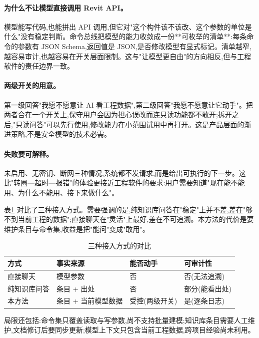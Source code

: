 \documentclass[UTF8,a4paper,zihao=-4]{ctexart}
\begin{document}
\paragraph{为什么不让模型直接调用 Revit API。}
模型能写代码,也能拼出 API 调用,但它对"这个构件该不该改、这个参数的单位是什么"没有稳定判断。命令总线把模型的能力收敛成一份**可枚举的清单**:每条命令的参数有 JSON Schema,返回值是 JSON,是否修改模型有显式标记。清单越窄,越容易审计,也越容易在开关层面限制。这与"让模型更自由"的方向相反,但与工程软件的责任边界一致。

\paragraph{两级开关的用意。}
第一级回答"我愿不愿意让 AI 看工程数据",第二级回答"我愿不愿意让它动手"。把两者合在一个开关上,保守用户会因为担心误改而连只读功能都不敢开;拆开之后,"只读问答"可以先行使用,修改能力在小范围试用中再打开。这是产品层面的渐进策略,不是安全模型的技术必需。

\paragraph{失败要可解释。}
未启用、无密钥、断网三种情况,系统都不发请求,而是给出可执行的下一步。这比"转圈—超时—报错"的体验更接近工程软件的要求:用户需要知道"现在能不能用、为什么不能用、接下来做什么"。

表\ref{tab:compare} 对比了三种接入方式。需要强调的是,纯知识库问答在"稳定"上并不差,差在"够不到当前工程的数据";直接聊天在"灵活"上最好,差在不可追溯。本方法的代价是要维护条目与命令集,收益是把"能问"变成"敢用"。

\begin{table}[H]
\centering
\caption{三种接入方式的对比}\label{tab:compare}
\small
\begin{tabular}{p{3.0cm}p{4.2cm}p{3.6cm}p{4.2cm}}
\toprule
方式 & 事实来源 & 能否动手 & 可审计性 \\
\midrule
直接聊天 & 模型参数 & 否 & 否(无法追溯) \\
纯知识库问答 & 条目 + 出处 & 否 & 部分(能看出处) \\
本方法 & 条目 + 当前模型数据 & 受控(两级开关) & 是(逐条日志) \\
\bottomrule
\end{tabular}
\end{table}

局限还包括:命令集只覆盖读取与写参数,尚不支持批量建模;知识库条目需要人工维护,文档修订后要同步更新;模型上下文只包含当前工程数据,跨项目经验尚未利用。
\end{document}

